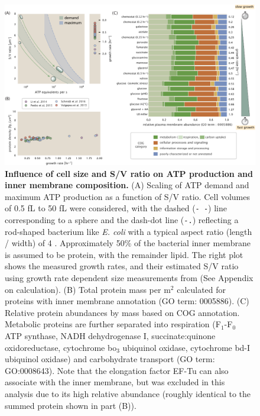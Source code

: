 \begin{figure}
    \begin{fullwidth}
            \includegraphics{main_figs/fig5_energy_SV_scaling.pdf}
            \caption{\textbf{Influence of cell size and S/V ratio on ATP
            production and inner membrane composition.} (A) Scaling of ATP
            demand and maximum ATP production as a function of S/V ratio.
            Cell volumes of 0.5 fL to 50 fL were considered, with the dashed
            (\texttt{- -}) line corresponding to a sphere and the dash-dot
            line (\texttt{-.}) reflecting a rod-shaped bacterium like
            \textit{E. coli} with a typical aspect ratio (length / width) of
            4 \citep{shi2018}. Approximately 50\% of the bacterial inner
            membrane is assumed to be protein, with the remainder lipid. The
            right plot shows the measured growth rates, and their estimated
            S/V ratio using growth rate dependent size measurements from
            \cite{si2017} (See Appendix  on
            calculation). (B) Total protein mass per \textmu m$^2$ calculated
            for proteins with inner membrane annotation (GO term: 0005886).
            (C) Relative protein abundances by mass based on COG annotation.
            Metabolic proteins are further separated into respiration
            (F$_1$-F$_0$ ATP synthase, NADH dehydrogenase I,
            succinate:quinone oxidoreductase, cytochrome bo$_3$ ubiquinol
            oxidase, cytochrome bd-I ubiquinol oxidase) and carbohydrate
            transport (GO term: GO:0008643). Note that the elongation factor
            EF-Tu can also associate with the inner membrane, but was
            excluded in this analysis due to its high relative abundance
            (roughly identical to the summed protein shown in part
            (B)).}\label{fig:energy_scaling}


\end{fullwidth}
\end{figure}
